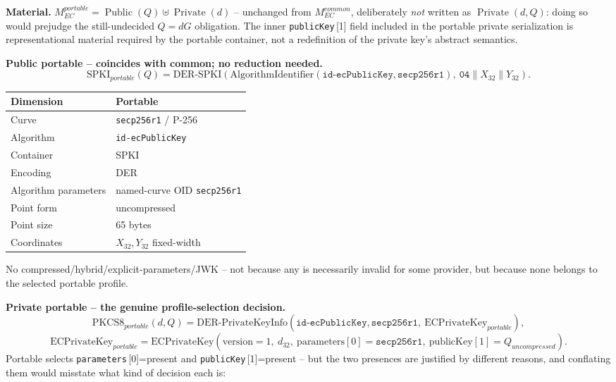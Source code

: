 \documentclass[11pt,a4paper]{article}
\begin{document}
\textbf{Material.} $M_{EC}^{portable} = \operatorname{Public}(Q) \uplus \operatorname{Private}(d)$ -- unchanged from $M_{EC}^{common}$, deliberately \emph{not} written as $\operatorname{Private}(d,Q)$: doing so would prejudge the still-undecided $Q=dG$ obligation. The inner \texttt{publicKey}\,[1] field included in the portable private serialization is representational material required by the portable container, not a redefinition of the private key's abstract semantics.

\textbf{Public portable -- coincides with common; no reduction needed.}
\[
\text{SPKI}_{portable}(Q) = \text{DER-SPKI}(\text{AlgorithmIdentifier}(\texttt{id-ecPublicKey},\texttt{secp256r1}),\ \texttt{04}\|X_{32}\|Y_{32}).
\]
\begin{center}
\begin{tabular}{@{}ll@{}}
\toprule
Dimension & Portable \\
\midrule
Curve & \texttt{secp256r1} / P-256 \\
Algorithm & \texttt{id-ecPublicKey} \\
Container & SPKI \\
Encoding & DER \\
Algorithm parameters & named-curve OID \texttt{secp256r1} \\
Point form & uncompressed \\
Point size & 65 bytes \\
Coordinates & $X_{32}, Y_{32}$ fixed-width \\
\bottomrule
\end{tabular}
\end{center}
No compressed/hybrid/explicit-parameters/JWK -- not because any is necessarily invalid for some provider, but because none belongs to the selected portable profile.

\textbf{Private portable -- the genuine profile-selection decision.}
\[
\text{PKCS8}_{portable}(d,Q) = \text{DER-PrivateKeyInfo}(\texttt{id-ecPublicKey},\texttt{secp256r1},\ \text{ECPrivateKey}_{portable}),
\]
\[
\text{ECPrivateKey}_{portable} = \text{ECPrivateKey}(\text{version}{=}1,\ d_{32},\ \text{parameters}[0]{=}\texttt{secp256r1},\ \text{publicKey}[1]{=}Q_{uncompressed}).
\]
Portable selects \texttt{parameters}\,[0]=present and \texttt{publicKey}\,[1]=present -- but the two presences are justified by different reasons, and conflating them would misstate what kind of decision each is:
\end{document}
